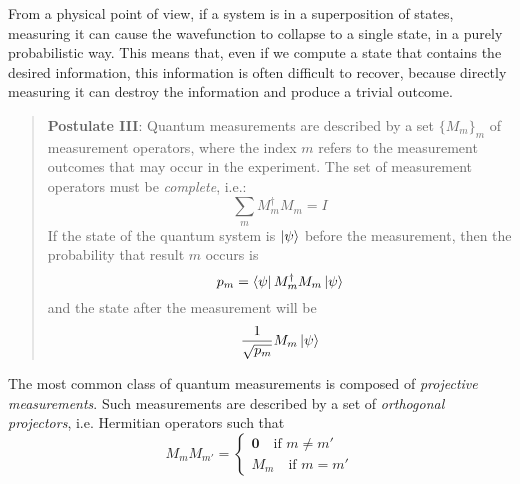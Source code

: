 \documentclass[10pt,a4paper, titlepage]{report}
\theoremstyle{definition}
\newcommand{\kp}{\ket{\psi}}
\begin{document}
From a physical point of view, if a system is in a superposition of states, measuring it can  cause the wavefunction to collapse to a single state, in a purely probabilistic way. This means that, even if we compute a state that contains the desired information, this information is often difficult to recover, because directly measuring  it can destroy the information and produce a trivial outcome.

\begin{quote} \textbf{Postulate III}: Quantum measurements are described by a set $\{M_m\}_m$ of measurement operators, where the index $m$ refers to the measurement outcomes that may occur in the experiment. The set of measurement operators must be \textit{complete}, i.e.:
\[\sum_m M_m^\dagger M_m = I\]
If the state of the quantum system is $\kp$ before the measurement, then the probability that result $m$ occurs is 
\[p_m = \bra{\psi}M_m^\dagger M_m\kp\]
and the state after the measurement will be \[\frac{1}{\sqrt{p_m}}M_m\kp\]
\end{quote}

The most common class of quantum measurements is composed of \textit{projective measurements}. Such measurements are described by a set of \textit{orthogonal projectors}, i.e. Hermitian operators such that \[ M_mM_{m'} = \begin{cases}\mathbf{0}\quad\text{if } m \neq m' \\ M_m\quad\text{if }m = m'\end{cases}\]
\end{document}
